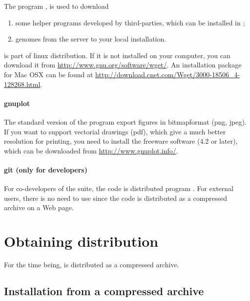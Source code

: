 \documentclass[12pt,a4paper, oneside]{scrreprt} %
\begin{document}
The program , is used  to download
\begin{enumerate}

\item some helper programs developed by third-parties, which can be
  installed in \RSAT;

\item genomes from the \RSAT server to your local \RSAT installation.

\end{enumerate}

 is part of linux distribution. If it is not installed
on your computer, you can download it from
\url{http://www.gnu.org/software/wget/}.  An installation package for
Mac OSX can be found at
\url{http://download.cnet.com/Wget/3000-18506_4-128268.html}.


\subsubsection{gnuplot}

The standard version of the \RSAT program  export
figures in bitmapformat (png, jpeg). If you want to support vectorial
drawings (pdf), which give a much better resolution for printing, you
need to install the freeware software  (4.2 or
later), which can be downloaded from \url{http://www.gnuplot.info/}.


\subsubsection{git (only for developers)}

For co-developers of the \RSAT suite, the code is distributed program
. For external users, there is no need to use
 since the code is distributed as a compressed archive on
a Web page.


\chapter{Obtaining \RSAT distribution}

For the time being, \RSAT is distributed as a compressed archive. 

\section{Installation from a compressed archive}
\end{document}
